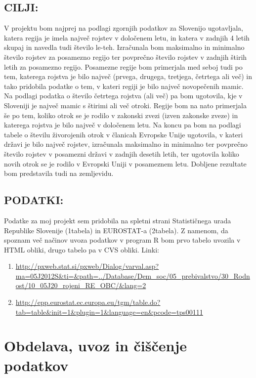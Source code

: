 \documentclass[11pt,a4paper]{article}
\begin{document}
\subsection{CILJI:}
V projektu bom najprej na podlagi zgornjih podatkov za Slovenijo ugotavljala, katera regija je imela največ rojstev v določenem letu, in katera v zadnjih 4 letih skupaj in navedla tudi število le-teh. Izračunala bom maksimalno in minimalno število rojstev za posamezno regijo ter povprečno število rojstev v zadnjih štirih letih za posamezno regijo. Posamezne regije bom primerjala med seboj tudi po tem, katerega rojstva je bilo največ (prvega, drugega, tretjega, četrtega ali več) in tako pridobila podatke o tem, v kateri regiji je bilo največ novopečenih mamic. Na podlagi podatka o število četrtega rojstva (ali več) pa bom ugotovila, kje v Sloveniji je največ mamic s štirimi ali več otroki.
Regije bom na nato primerjala še po tem, koliko otrok se je rodilo v zakonski zvezi (izven zakonske zveze) in katerega rojstva je bilo največ v določenem letu.
Na koncu pa bom na podlagi tabele o številu živorojenih otrok v članicah Evropske Unije ugotovila, v kateri državi je bilo največ rojstev, izračunala maksimalno in minimalno ter povprečno število rojstev v posamezni državi v zadnjih desetih letih, ter ugotovila koliko novih otrok se je rodilo v Evropski Uniji v posameznem letu.
Dobljene rezultate bom predstavila tudi na zemljevidu.

 

\subsection{PODATKI:}
Podatke za moj projekt sem pridobila na spletni strani Statističnega urada Republike Slovenije (1tabela) in EUROSTAT-a (2tabela). Z namenom, da spoznam več načinov uvoza podatkov v program R bom prvo tabelo uvozila v HTML obliki, drugo tabelo pa v CVS obliki.
Linki:
\begin{enumerate}
\item{\url{http://pxweb.stat.si/pxweb/Dialog/varval.asp?ma=05J2012S&ti=&path=../Database/Dem_soc/05_prebivalstvo/30_Rodnost/10_05J20_rojeni_RE_OBC/&lang=2}}
\item{\url{http://epp.eurostat.ec.europa.eu/tgm/table.do?tab=table&init=1&plugin=1&language=en&pcode=tps00111}}
\end{enumerate}


 
\newpage
\section{Obdelava, uvoz in čiščenje podatkov}
\end{document}
